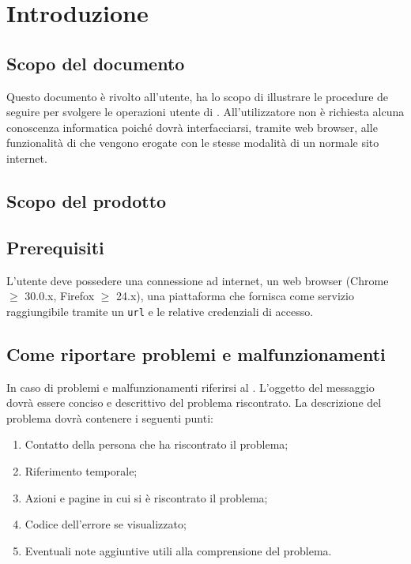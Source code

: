 \section{Introduzione}


	\subsection{Scopo del documento}
	Questo documento è rivolto all'utente, ha lo scopo di illustrare le procedure de seguire per svolgere le operazioni utente di . All'utilizzatore non è richiesta alcuna conoscenza informatica poiché dovrà interfacciarsi, tramite web browser, alle funzionalità di  che vengono erogate con le stesse modalità di un normale sito internet.

	\subsection{Scopo del prodotto}
	\ScopoDelProdotto{}

	\subsection{Prerequisiti}
	L'utente deve possedere una connessione ad internet, un web browser (Chrome $\geq$ 30.0.x, Firefox $\geq$ 24.x), una piattaforma che fornisca  come servizio raggiungibile tramite un \texttt{url} e le relative credenziali di accesso.

	
	\subsection{Come riportare problemi e malfunzionamenti}
	In caso di problemi e malfunzionamenti riferirsi al . L'oggetto del messaggio dovrà essere conciso e descrittivo del problema riscontrato. La descrizione del problema dovrà contenere i seguenti punti:

	\begin{enumerate}
		\item Contatto della persona che ha riscontrato il problema;
		\item Riferimento temporale;
		\item Azioni e pagine in cui si è riscontrato il problema;
		\item Codice dell'errore se visualizzato;
		\item Eventuali note aggiuntive utili alla comprensione del problema.
	\end{enumerate}

